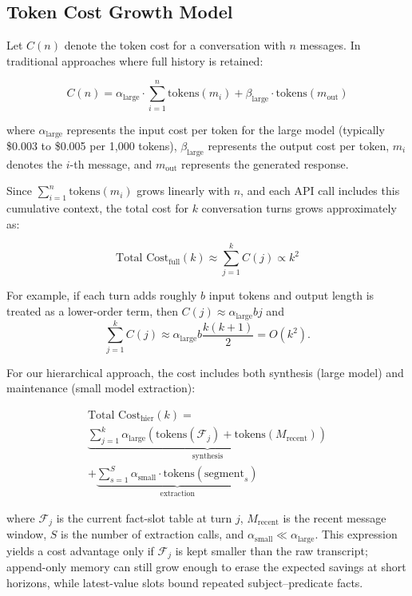 \documentclass[conference]{IEEEtran}
\begin{document}
\subsection{Token Cost Growth Model}

Let $C(n)$ denote the token cost for a conversation with $n$ messages. In traditional approaches where full history is retained:

\begin{equation}
C(n) = \alpha_{\text{large}} \cdot \sum_{i=1}^{n} \text{tokens}(m_i) + \beta_{\text{large}} \cdot \text{tokens}(m_{\text{out}})
\end{equation}

where $\alpha_{\text{large}}$ represents the input cost per token for the large model (typically \$0.003 to \$0.005 per 1,000 tokens), $\beta_{\text{large}}$ represents the output cost per token, $m_i$ denotes the $i$-th message, and $m_{\text{out}}$ represents the generated response.

Since $\sum_{i=1}^{n} \text{tokens}(m_i)$ grows linearly with $n$, and each API call includes this cumulative context, the total cost for $k$ conversation turns grows approximately as:

\begin{equation}
\text{Total Cost}_{\text{full}}(k) \approx \sum_{j=1}^{k} C(j) \propto k^2
\end{equation}

For example, if each turn adds roughly $b$ input tokens and output length is treated as a lower-order term, then $C(j) \approx \alpha_{\text{large}} b j$ and
\begin{equation}
\sum_{j=1}^{k} C(j) \approx \alpha_{\text{large}} b \frac{k(k+1)}{2} = O(k^2).
\end{equation}

For our hierarchical approach, the cost includes both synthesis (large model) and maintenance (small model extraction):

\begin{multline}
\text{Total Cost}_{\text{hier}}(k) = \\
\underbrace{\textstyle\sum_{j=1}^{k} \alpha_{\text{large}} (\text{tokens}(\mathcal{F}_j) + \text{tokens}(M_{\text{recent}}))}_{\text{synthesis}} \\
+ \underbrace{\textstyle\sum_{s=1}^{S} \alpha_{\text{small}} \cdot \text{tokens}(\text{segment}_s)}_{\text{extraction}}
\end{multline}

where $\mathcal{F}_j$ is the current fact-slot table at turn $j$, $M_{\text{recent}}$ is the recent message window, $S$ is the number of extraction calls, and $\alpha_{\text{small}} \ll \alpha_{\text{large}}$. This expression yields a cost advantage only if $\mathcal{F}_j$ is kept smaller than the raw transcript; append-only memory can still grow enough to erase the expected savings at short horizons, while latest-value slots bound repeated subject--predicate facts.
\end{document}

